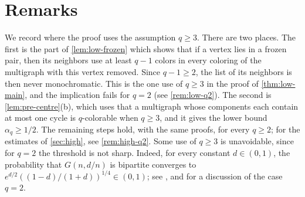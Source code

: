 \section{Remarks}\label{sec:proof-remarks}

\begin{remark}\label{rem:proof-q3}
We record where the proof uses the assumption $q \ge 3$. There are two places. The first is the part of \cref{lem:low-frozen} which shows that if a vertex lies in a frozen pair, then its neighbors use at least $q - 1$ colors in every coloring of the multigraph with this vertex removed. Since $q - 1 \ge 2$, the list of its neighbors is then never monochromatic. This is the one use of $q \ge 3$ in the proof of \cref{thm:low-main}, and the implication fails for $q = 2$ (see \cref{rem:low-q2}). The second is \cref{lem:pre-centre}(b), which uses that a multigraph whose components each contain at most one cycle is $q$-colorable when $q \ge 3$, and it gives the lower bound $\alpha_q \ge 1/2$. The remaining steps hold, with the same proofs, for every $q \ge 2$; for the estimates of \cref{sec:high}, see \cref{rem:high-q2}. Some use of $q \ge 3$ is unavoidable, since for $q = 2$ the threshold is not sharp. Indeed, for every constant $d \in (0, 1)$, the probability that $G(n, d/n)$ is bipartite converges to $e^{d/2} ((1 - d)/(1 + d))^{1/4} \in (0, 1)$; see \cite[Section~1, equation~(1.5)]{pittel2010frequently}, and \cite[p.~64]{achlioptas1999sharp} for a discussion of the case $q = 2$.
\end{remark}

